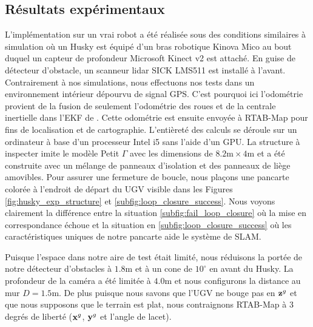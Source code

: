 \subsection{Résultats expérimentaux}

L'implémentation sur un vrai robot a été réalisée sous des conditions similaires à simulation où un Husky est équipé d'un bras robotique Kinova Mico au bout duquel un capteur de profondeur Microsoft Kinect v2 est attaché. En guise de détecteur d'obstacle, un scanneur lidar SICK LMS511 est installé à l'avant. Contrairement à nos simulations, nous effectuons nos tests dans un environnement intérieur dépourvu de signal GPS. C'est pourquoi ici l'odométrie provient de la fusion de seulement l'odométrie des roues et de la centrale inertielle dans l'EKF de \citep{MooreEkf2014}. Cette odométrie est ensuite envoyée à RTAB-Map \citep{Labbe2014} pour fins de localisation et de cartographie. L'entièreté des calculs se déroule sur un ordinateur à base d'un processeur Intel i5 sans l'aide d'un GPU. La structure à inspecter imite le modèle Petit $\Gamma$ avec les dimensions de $8.2\text{m} \times 4\text{m}$ et a été construite avec un mélange de panneaux d'isolation et des panneaux de liège amovibles. Pour assurer une fermeture de boucle, nous plaçons une pancarte colorée à l'endroit de départ du UGV visible dans les Figures \ref{fig:husky_exp_structure} et \ref{subfig:loop_closure_success}. Nous voyons clairement la différence entre la situation \ref{subfig:fail_loop_closure} où la mise en correspondance échoue et la situation en \ref{subfig:loop_closure_success} où les caractéristiques uniques de notre pancarte aide le système de SLAM.

Puisque l'espace dans notre aire de test était limité, nous réduisons la portée de notre détecteur d'obstacles à $1.8$m et à un cone de $10^\circ$  en avant du Husky. La profondeur de la caméra a été limitée à $4.0$m et nous configurons la distance au mur $D=1.5$m. De plus puisque nous savons que l'UGV ne bouge pas en $\mathbf{z}^g$ et que nous supposons que le terrain est plat, nous contraignons RTAB-Map à $3$ degrés de liberté ($\mathbf{x}^g$, $\mathbf{y}^g$ et l'angle de lacet).


